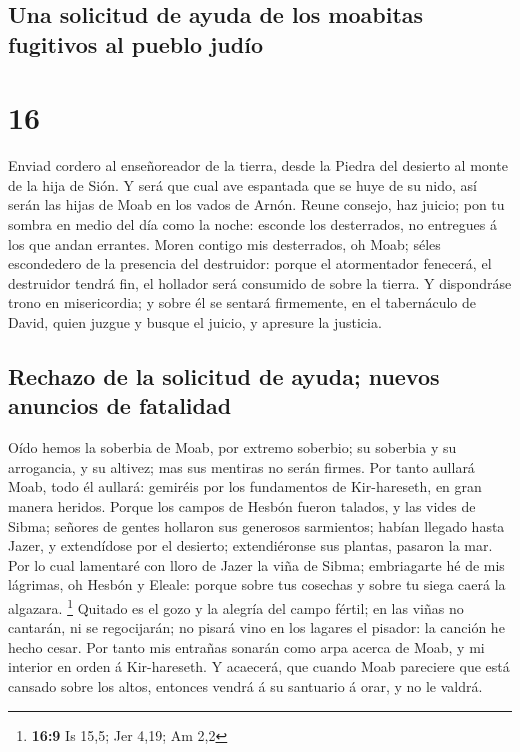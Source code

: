 \hypertarget{una-solicitud-de-ayuda-de-los-moabitas-fugitivos-al-pueblo-juduxedo}{%
\subsection{Una solicitud de ayuda de los moabitas fugitivos al pueblo
judío}\label{una-solicitud-de-ayuda-de-los-moabitas-fugitivos-al-pueblo-juduxedo}}

\hypertarget{section-15}{%
\section{16}\label{section-15}}

 Enviad cordero al enseñoreador de la tierra, desde la
Piedra del desierto al monte de la hija de Sión.  Y será que
cual ave espantada que se huye de su nido, así serán las hijas de Moab
en los vados de Arnón.  Reune consejo, haz juicio; pon tu
sombra en medio del día como la noche: esconde los desterrados, no
entregues á los que andan errantes.  Moren contigo mis
desterrados, oh Moab; séles escondedero de la presencia del destruidor:
porque el atormentador fenecerá, el destruidor tendrá fin, el hollador
será consumido de sobre la tierra.  Y dispondráse trono en
misericordia; y sobre él se sentará firmemente, en el tabernáculo de
David, quien juzgue y busque el juicio, y apresure la justicia.

\hypertarget{rechazo-de-la-solicitud-de-ayuda-nuevos-anuncios-de-fatalidad}{%
\subsection{Rechazo de la solicitud de ayuda; nuevos anuncios de
fatalidad}\label{rechazo-de-la-solicitud-de-ayuda-nuevos-anuncios-de-fatalidad}}

 Oído hemos la soberbia de Moab, por extremo soberbio; su
soberbia y su arrogancia, y su altivez; mas sus mentiras no serán
firmes.  Por tanto aullará Moab, todo él aullará: gemiréis
por los fundamentos de Kir-hareseth, en gran manera heridos.
 Porque los campos de Hesbón fueron talados, y las vides de
Sibma; señores de gentes hollaron sus generosos sarmientos; habían
llegado hasta Jazer, y extendídose por el desierto; extendiéronse sus
plantas, pasaron la mar.  Por lo cual lamentaré con lloro de
Jazer la viña de Sibma; embriagarte hé de mis lágrimas, oh Hesbón y
Eleale: porque sobre tus cosechas y sobre tu siega caerá la algazara.
\footnote{\textbf{16:9} Is 15,5; Jer 4,19; Am 2,2}  Quitado
es el gozo y la alegría del campo fértil; en las viñas no cantarán, ni
se regocijarán; no pisará vino en los lagares el pisador: la canción he
hecho cesar.  Por tanto mis entrañas sonarán como arpa
acerca de Moab, y mi interior en orden á Kir-hareseth.  Y
acaecerá, que cuando Moab pareciere que está cansado sobre los altos,
entonces vendrá á su santuario á orar, y no le valdrá.

